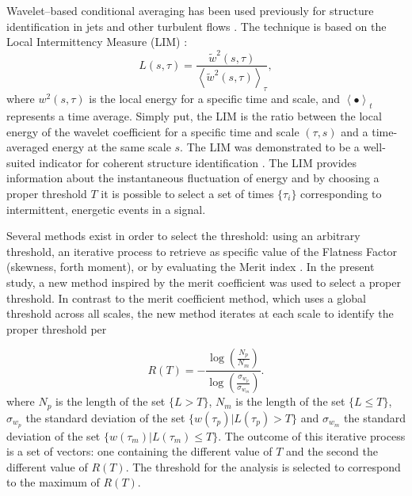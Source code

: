 Wavelet--based conditional averaging has been used previously for structure identification in jets and other turbulent flows \citep{Camussi1997,Camussi1999,Guj1999,Camussi2002,Guj2003}.
The technique is based on the Local Intermittency Measure (LIM) \citep{Farge1992}:
\begin{equation}
\label{eqn:LIM}
L(s, \tau) = \frac{\tilde{w}^{2}(s, \tau)}{\left<\tilde{w}^{2} (s, \tau)\right>_{\tau}},
\end{equation}
where $w^{2}(s, \tau)$ is the local energy for a specific time and scale, and $\left< \bullet \right>_{t}$ represents a time average. Simply put, the LIM is the ratio between the local energy of the wavelet coefficient for a specific time and scale $(\tau, s)$ and a time-averaged energy at the same scale $s$. The LIM was demonstrated to be a well-suited indicator for coherent structure identification \citep{Camussi1997}.  The LIM provides information about the instantaneous fluctuation of energy and by choosing a proper threshold $T$ it is possible to select a set of times $\{\tau_{i}\}$ corresponding to intermittent, energetic events in a signal.

Several methods exist in order to select the threshold: using an arbitrary threshold, an iterative process to retrieve as specific value of the Flatness Factor (skewness, forth moment), or by evaluating the Merit index \citep{Grassucci2015}. 
In the present study, a new method inspired by the merit coefficient was used to select a proper threshold. 
In contrast to the merit coefficient method, which uses a global threshold across all scales, the new method iterates at each scale to identify the proper threshold per 

\begin{equation} \label{eqn:tEvaluation}
R(T) = -\frac{\log\left(\frac{N_p}{N_m}\right)}{\log\left(\frac{\sigma_{w_p}}{\sigma_{w_m}}\right)}.
\end{equation} 
where $N_p$ is the length of the set $\{L > T\}$, $N_m$ is the length of the set $\{L \leqslant T\}$, $\sigma_{w_p}$ the standard deviation of the set $\{w\left( \tau_p\right) | L\left( \tau_p \right) > T\}$ and $\sigma_{w_m}$ the standard deviation of the set $\{w\left( \tau_m\right) | L\left( \tau_m \right) \leqslant T\}$.
The outcome of this iterative process is a set of vectors: one containing the different value of $T$ and the second the different value of $R(T)$. The threshold for the analysis is selected to correspond to the maximum of $R(T)$.

